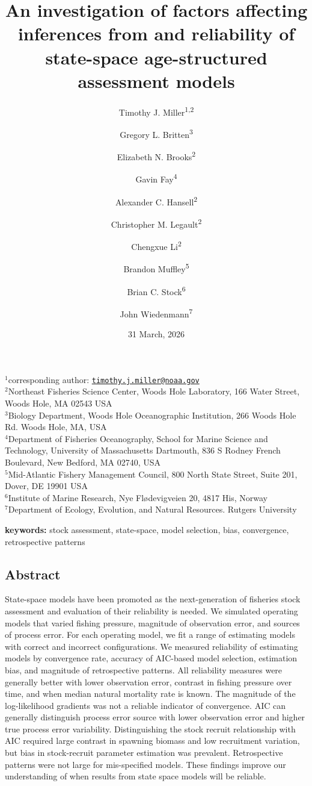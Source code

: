 \documentclass[
  12pt,
]{article}
\title{An investigation of factors affecting inferences from and
reliability of state-space age-structured assessment models}
\author{Timothy J. Miller\textsuperscript{1,2} \and Gregory L.
Britten\textsuperscript{3} \and Elizabeth N.
Brooks\textsuperscript{2} \and Gavin
Fay\textsuperscript{4} \and Alexander C.
Hansell\textsuperscript{2} \and Christopher M.
Legault\textsuperscript{2} \and Chengxue
Li\textsuperscript{2} \and Brandon Muffley\textsuperscript{5} \and Brian
C. Stock\textsuperscript{6} \and John Wiedenmann\textsuperscript{7}}
\date{31 March, 2026}
\begin{document}
\maketitle

\(^1\)corresponding author:
\href{mailto:timothy.j.miller@noaa.gov}{\nolinkurl{timothy.j.miller@noaa.gov}}\\
\(^2\)Northeast Fisheries Science Center, Woods Hole Laboratory, 166
Water Street, Woods Hole, MA 02543 USA\\
\(^3\)Biology Department, Woods Hole Oceanographic Institution, 266
Woods Hole Rd. Woods Hole, MA, USA\\
\(^4\)Department of Fisheries Oceanography, School for Marine Science
and Technology, University of Massachusetts Dartmouth, 836 S Rodney
French Boulevard, New Bedford, MA 02740, USA\\
\(^5\)Mid-Atlantic Fishery Management Council, 800 North State Street,
Suite 201, Dover, DE 19901 USA\\
\(^6\)Institute of Marine Research, Nye Flødevigveien 20, 4817 His,
Norway\\
\(^7\)Department of Ecology, Evolution, and Natural Resources. Rutgers
University\\

\pagebreak

\textbf{keywords:} stock assessment, state-space, model selection, bias,
convergence, retrospective patterns

\subsection*{Abstract}\label{abstract}

State-space models have been promoted as the next-generation of
fisheries stock assessment and evaluation of their reliability is
needed. We simulated operating models that varied fishing pressure,
magnitude of observation error, and sources of process error. For each
operating model, we fit a range of estimating models with correct and
incorrect configurations. We measured reliability of estimating models
by convergence rate, accuracy of AIC-based model selection, estimation
bias, and magnitude of retrospective patterns. All reliability measures
were generally better with lower observation error, contrast in fishing
pressure over time, and when median natural mortality rate is known. The
magnitude of the log-likelihood gradients was not a reliable indicator
of convergence. AIC can generally distinguish process error source with
lower observation error and higher true process error variability.
Distinguishing the stock recruit relationship with AIC required large
contrast in spawning biomass and low recruitment variation, but bias in
stock-recruit parameter estimation was prevalent. Retrospective patterns
were not large for mis-specified models. These findings improve our
understanding of when results from state space models will be reliable.
\end{document}
